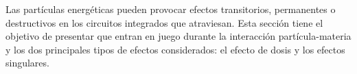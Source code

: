 Las partículas energéticas pueden provocar efectos transitorios, permanentes o destructivos en los circuitos integrados que atraviesan. Esta sección tiene el objetivo de presentar  que entran en juego durante la interacción partícula-materia y los dos principales tipos de efectos considerados: el efecto de dosis y los efectos singulares.